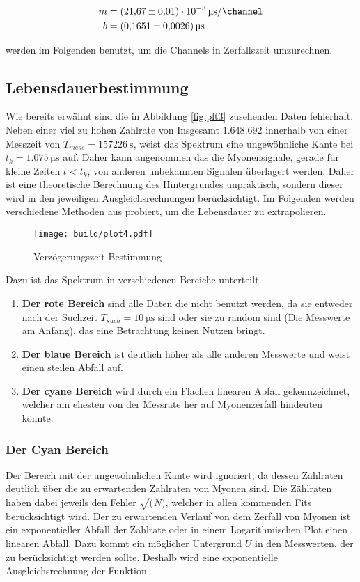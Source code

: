 \begin{align*}
	m&=\qty{21,67(0,01)e-3}{\us\per\channel}\\
	b&=\qty{0,1651(0,0026)}{\us}
\end{align*}

werden im Folgenden benutzt, um die Channels in Zerfallszeit umzurechnen. 

\subsection{Lebensdauerbestimmung}
Wie bereits erwähnt sind die in Abbildung \eqref{fig:plt3} zusehenden Daten fehlerhaft. 
Neben einer viel zu hohen Zahlrate von Insgesamt $1.648.692$ innerhalb von einer Messzeit von $T_{mess}=\qty{157226}{\s}$,
weist das Spektrum eine ungewöhnliche Kante bei $t_k=\qty{1.075}{\us}$ auf.
Daher kann angenommen das die Myonensignale, gerade für kleine Zeiten $t<t_k$, von anderen unbekannten Signalen überlagert werden. 
Daher ist eine theoretische Berechnung des Hintergrundes unpraktisch, sondern dieser wird in den jeweiligen Ausgleichsrechnungen berücksichtigt. 
Im Folgenden werden verschiedene Methoden aus probiert, um die Lebensdauer zu extrapolieren. 
 
\begin{figure}[H]
	\centering
	\texttt{[image: build/plot4.pdf]}
	\caption{Verzögerungszeit Bestimmung}\label{fig:plt4}
\end{figure}

Dazu ist das Spektrum in verschiedenen Bereiche unterteilt. 

\begin{enumerate}
	\item \textbf{Der rote Bereich} sind alle Daten die nicht benutzt werden, da sie entweder nach der Suchzeit $T_{such}=\qty{10}{\us}$ sind 
	oder sie zu random sind (Die Messwerte am Anfang), das eine Betrachtung keinen Nutzen bringt. 
	\item \textbf{Der blaue Bereich} ist deutlich höher als alle anderen Messwerte und weist einen steilen Abfall auf. 
	\item \textbf{Der cyane Bereich} wird durch ein Flachen linearen Abfall gekennzeichnet, welcher am ehesten von der Messrate her auf Myonenzerfall hindeuten könnte. 
\end{enumerate}

\subsubsection{Der Cyan Bereich}
Der Bereich mit der ungewöhnlichen Kante wird ignoriert, da dessen Zählraten deutlich über die zu erwartenden Zahlraten von Myonen sind. 
Die Zählraten haben dabei jeweils den Fehler $\sqrt(N) $, welcher in allen kommenden Fits berücksichtigt wird. 
Der zu erwartenden Verlauf von dem Zerfall von Myonen ist ein exponentieller Abfall der Zahlrate oder in einem Logarithmischen Plot einen linearen Abfall. 
Dazu kommt ein möglicher Untergrund $U$ in den Messwerten, der zu berücksichtigt werden sollte. 
Deshalb wird eine exponentielle Ausgleichsrechnung der Funktion

